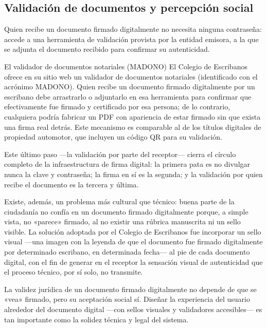 \documentclass[12pt,oneside]{book}
\begin{document}
\subsection{Validación de documentos y percepción social}

Quien recibe un documento firmado digitalmente no necesita ninguna contraseña: accede a una herramienta de validación provista por la entidad emisora, a la que se adjunta el documento recibido para confirmar su autenticidad.

\begin{example}{El validador de documentos notariales (MADONO)}
El Colegio de Escribanos ofrece en su sitio web un validador de documentos notariales (identificado con el acrónimo MADONO). Quien recibe un documento firmado digitalmente por un escribano debe arrastrarlo o adjuntarlo en esa herramienta para confirmar que efectivamente fue firmado y certificado por esa persona; de lo contrario, cualquiera podría fabricar un PDF con apariencia de estar firmado sin que exista una firma real detrás. Este mecanismo es comparable al de los títulos digitales de propiedad automotor, que incluyen un código QR para su validación.
\end{example}

Este último paso ---la validación por parte del receptor--- cierra el círculo completo de la infraestructura de firma digital: la primera pata es no divulgar nunca la clave y contraseña; la firma en sí es la segunda; y la validación por quien recibe el documento es la tercera y última.

Existe, además, un problema más cultural que técnico: buena parte de la ciudadanía no confía en un documento firmado digitalmente porque, a simple vista, no «parece» firmado, al no existir una rúbrica manuscrita ni un sello visible. La solución adoptada por el Colegio de Escribanos fue incorporar un sello visual ---una imagen con la leyenda de que el documento fue firmado digitalmente por determinado escribano, en determinada fecha--- al pie de cada documento digital, con el fin de generar en el receptor la sensación visual de autenticidad que el proceso técnico, por sí solo, no transmite.

\begin{important}
La validez jurídica de un documento firmado digitalmente no depende de que se «vea» firmado, pero su aceptación social sí. Diseñar la experiencia del usuario alrededor del documento digital ---con sellos visuales y validadores accesibles--- es tan importante como la solidez técnica y legal del sistema.
\end{important}
\end{document}
